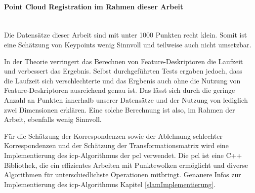 \paragraph{Point Cloud Registration im Rahmen dieser Arbeit} \mbox{}\\
Die Datensätze dieser Arbeit sind mit unter 1000 Punkten recht klein.
Somit ist eine Schätzung von Keypoints wenig Sinnvoll und teilweise auch nicht umsetzbar.

In der Theorie verringert das Berechnen von Feature-Deskriptoren die Laufzeit und verbessert das Ergebnis.
Selbst durchgeführten Tests ergaben jedoch, dass die Laufzeit sich verschlechterte 
und das Ergbenis auch ohne die Nutzung von Feature-Deskriptoren ausreichend genau ist.
Das lässt sich durch die geringe Anzahl an Punkten innerhalb unserer Datensätze und der Nutzung von lediglich zwei Dimensionen erklären.
Eine solche Berechnung ist also, im Rahmen der Arbeit, ebenfalls wenig Sinnvoll.

Für die Schätzung der Korrespondenzen sowie der Ablehnung schlechter Korrespondenzen 
und der Schätzung der Transformationsmatrix wird eine Implementierung des \acf{icp}-Algorithmus der \acf{pcl} verwendet.
Die \ac{pcl} ist eine C++ Bibliothek, die ein effizientes Arbeiten mit Punktewolken ermöglicht
und diverse Algorithmen für unterschiedlichste Operationen mitbringt.
Genauere Infos zur Implementierung des \ac{icp}-Algorithmus Kapitel \ref{slamImplementierung}.

\newpage
